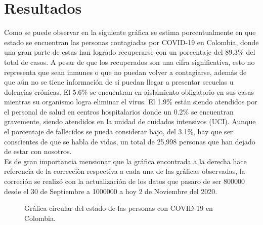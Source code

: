 \documentclass[conference,compsoc,onecolumn]{IEEEtran}
\begin{document}
\label{sec:results}

\section{Resultados}
Como se puede observar en la siguiente gráfica se estima porcentualmente en que estado se encuentran las personas contagiadas por COVID-19 en Colombia, donde una gran parte de estas han logrado recuperarse con un porcentaje del 89.3\% del total de casos. A pesar de que los recuperados son una cifra significativa, esto no representa que sean inmunes o que no puedan volver a contagiarse, además de que aún no se tiene información de si puedan llegar a presentar secuelas u dolencias crónicas. El 5.6\% se encuentran en aislamiento obligatorio en sus casas mientras su organismo logra eliminar el virus. El 1.9\% están siendo atendidos por el personal de salud en centros hospitalarios donde un 0.2\% se encuentran gravemente, siendo atendidos en la unidad de cuidados intensivos (UCI). Aunque el porcentaje de fallecidos se pueda considerar bajo, del 3.1\%, hay que ser conscientes de que se habla de vidas, un total de 25,998 personas que han dejado de estar con nosotros.\\
Es de gran importancia mensionar que la gráfica encontrada a la derecha hace referencia de la correcciòn respectiva a cada una de las gráficas observadas, la correción se realizó con la actualización de los datos que pasaro de ser 800000 desde el 30 de Septiembre a 1000000 a hoy 2 de Noviembre del 2020.

\begin{figure}[htbp]
\centering
{}
\caption{Gráfica circular del estado de las personas con COVID-19 en Colombia.} \label{fig:lego}
\end{figure}
\end{document}
